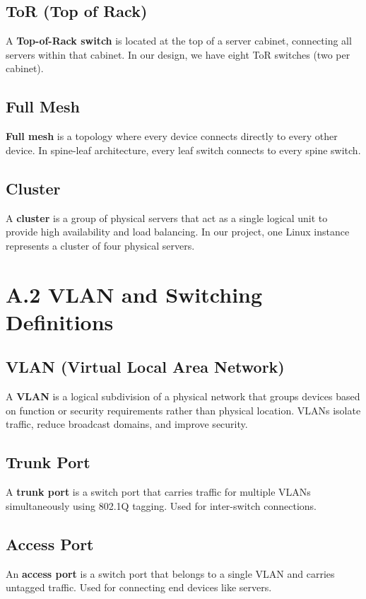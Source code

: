\subsection*{ToR (Top of Rack)}
\label{def:tor}
A \textbf{Top-of-Rack switch} is located at the top of a server cabinet, 
connecting all servers within that cabinet. In our design, we have eight 
ToR switches (two per cabinet).

\subsection*{Full Mesh}
\label{def:fullmesh}
\textbf{Full mesh} is a topology where every device connects directly to every 
other device. In spine-leaf architecture, every leaf switch connects to every 
spine switch.
\subsection*{Cluster}
\label{def:cluster}
A \textbf{cluster} is a group of physical servers that act as a single 
logical unit to provide high availability and load balancing. In our 
project, one Linux instance represents a cluster of four physical servers.

\section*{A.2 VLAN and Switching Definitions}

\subsection*{VLAN (Virtual Local Area Network)}
\label{def:vlan}
A \textbf{VLAN} is a logical subdivision of a physical network that groups 
devices based on function or security requirements rather than physical 
location. VLANs isolate traffic, reduce broadcast domains, and improve 
security.

\subsection*{Trunk Port}
\label{def:trunk}
A \textbf{trunk port} is a switch port that carries traffic for multiple 
VLANs simultaneously using 802.1Q tagging. Used for inter-switch connections.

\subsection*{Access Port}
\label{def:accessport}
An \textbf{access port} is a switch port that belongs to a single VLAN and 
carries untagged traffic. Used for connecting end devices like servers.

